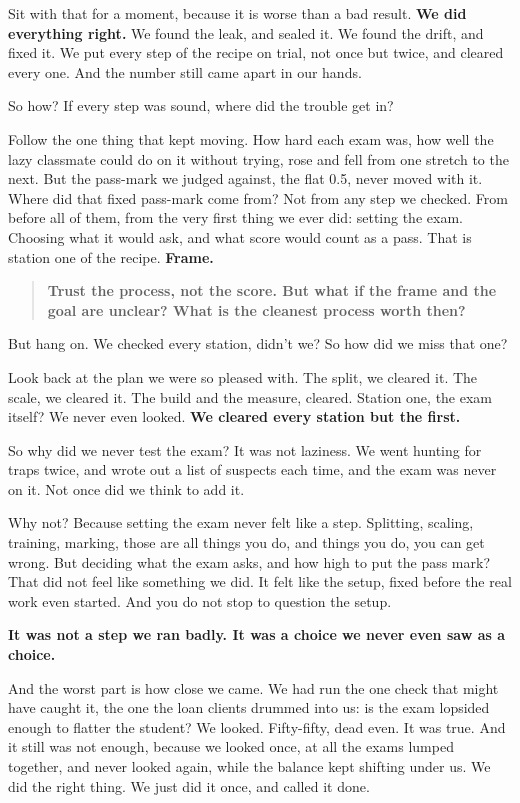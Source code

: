 \documentclass[11pt]{article} %
\begin{document}
Sit with that for a moment, because it is worse than a bad result. \textbf{We did everything right.} We found the leak, and sealed it. We found the drift, and fixed it. We put every step of the recipe on trial, not once but twice, and cleared every one. And the number still came apart in our hands.

So how? If every step was sound, where did the trouble get in?

Follow the one thing that kept moving. How hard each exam was, how well the lazy classmate could do on it without trying, rose and fell from one stretch to the next. But the pass-mark we judged against, the flat 0.5, never moved with it. Where did that fixed pass-mark come from? Not from any step we checked. From before all of them, from the very first thing we ever did: setting the exam. Choosing what it would ask, and what score would count as a pass. That is station one of the recipe. \textbf{Frame.}


\begin{quote}
\textbf{Trust the process, not the score. But what if the frame and the goal are unclear? What is the cleanest process worth then?}
\end{quote}


But hang on. We checked every station, didn't we? So how did we miss that one?

Look back at the plan we were so pleased with. The split, we cleared it. The scale, we cleared it. The build and the measure, cleared. Station one, the exam itself? We never even looked. \textbf{We cleared every station but the first.}

So why did we never test the exam? It was not laziness. We went hunting for traps twice, and wrote out a list of suspects each time, and the exam was never on it. Not once did we think to add it.

Why not? Because setting the exam never felt like a step. Splitting, scaling, training, marking, those are all things you do, and things you do, you can get wrong. But deciding what the exam asks, and how high to put the pass mark? That did not feel like something we did. It felt like the setup, fixed before the real work even started. And you do not stop to question the setup.

\textbf{It was not a step we ran badly. It was a choice we never even saw as a choice.}

And the worst part is how close we came. We had run the one check that might have caught it, the one the loan clients drummed into us: is the exam lopsided enough to flatter the student? We looked. Fifty-fifty, dead even. It was true. And it still was not enough, because we looked once, at all the exams lumped together, and never looked again, while the balance kept shifting under us. We did the right thing. We just did it once, and called it done.
\end{document}
